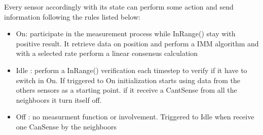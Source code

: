 \documentclass[twocolumn]{article}
\begin{document}
    Every sensor accordingly with its state can perform some action and send information following the rules listed below:
\begin{itemize}
    \item On: participate in the measurement process while InRange() stay with positive result. 
    It retrieve data on position and perform a IMM algorithm and with a selected rate perform a linear consensus calculation 
    \item Idle : perform a InRange() verification each timestep to verify if it have to switch in On. If triggered to On 
    initialization starts using data from the others sensors as a starting point.
    if it receive a CantSense from all the neighboors it turn itself off.
    \item Off : no measurment function or involvement. Triggered to Idle when receive one CanSense by the neighboors
    \end{itemize}

           
\end{document}
